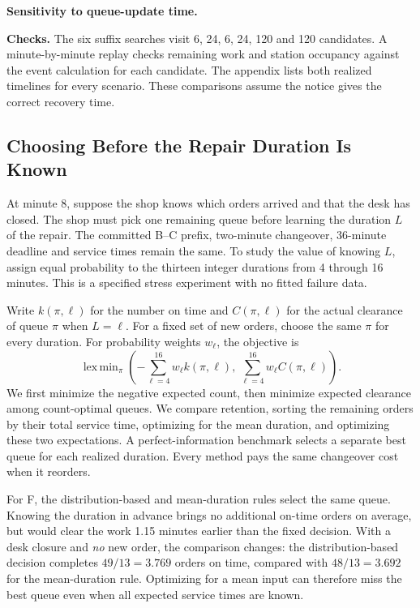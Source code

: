\documentclass{swmcmthesis}
\begin{document}
\noindent\textbf{Sensitivity to queue-update time.} \SensitivityText

\noindent\textbf{Checks.} The six suffix searches visit 6, 24, 6, 24, 120 and 120 candidates. A minute-by-minute replay checks remaining work and station occupancy against the event calculation for each candidate. The appendix lists both realized timelines for every scenario. These comparisons assume the notice gives the correct recovery time.

\clearpage
\subsection{Choosing Before the Repair Duration Is Known}
At minute 8, suppose the shop knows which orders arrived and that the desk has closed. The shop must pick one remaining queue before learning the duration \(L\) of the repair. The committed B--C prefix, two-minute changeover, 36-minute deadline and service times remain the same. To study the value of knowing \(L\), assign equal probability to the thirteen integer durations from 4 through 16 minutes. This is a specified stress experiment with no fitted failure data.

Write \(k(\pi,\ell)\) for the number on time and \(C(\pi,\ell)\) for the actual clearance of queue \(\pi\) when \(L=\ell\). For a fixed set of new orders, choose the same \(\pi\) for every duration. For probability weights \(w_\ell\), the objective is
\[
 \mathop{\mathrm{lex\,min}}_{\pi}\left(
  -\sum_{\ell=4}^{16} w_\ell k(\pi,\ell),\
   \sum_{\ell=4}^{16} w_\ell C(\pi,\ell)\right).
\]
We first minimize the negative expected count, then minimize expected clearance among count-optimal queues. We compare retention, sorting the remaining orders by their total service time, optimizing for the mean duration, and optimizing these two expectations. A perfect-information benchmark selects a separate best queue for each realized duration. Every method pays the same changeover cost when it reorders.

\begin{table}[H]\centering
\caption{One new order F. Expectations over the thirteen equally weighted repair durations.}
\RecoveryTable
\end{table}
For F, the distribution-based and mean-duration rules select the same queue. Knowing the duration in advance brings no additional on-time orders on average, but would clear the work 1.15 minutes earlier than the fixed decision. With a desk closure and \emph{no} new order, the comparison changes: the distribution-based decision completes \(49/13=3.769\) orders on time, compared with \(48/13=3.692\) for the mean-duration rule. Optimizing for a mean input can therefore miss the best queue even when all expected service times are known.
\end{document}
